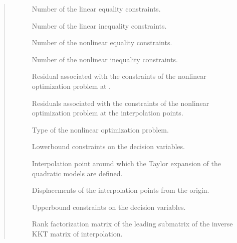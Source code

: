 \documentclass[letterpaper,10pt,english]{sphinxmanual}
\begin{document}
\begin{fulllineitems}
\begin{quote}
\begin{description}
\begin{description}
\item[{}] \leavevmode
\sphinxAtStartPar
Number of the linear equality constraints.

\item[{}] \leavevmode
\sphinxAtStartPar
Number of the linear inequality constraints.

\item[{}] \leavevmode
\sphinxAtStartPar
Number of the nonlinear equality constraints.

\item[{}] \leavevmode
\sphinxAtStartPar
Number of the nonlinear inequality constraints.

\item[{}] \leavevmode
\sphinxAtStartPar
Residual associated with the constraints of the nonlinear optimization problem at .

\item[{}] \leavevmode
\sphinxAtStartPar
Residuals associated with the constraints of the nonlinear optimization problem at the interpolation points.

\item[{}] \leavevmode
\sphinxAtStartPar
Type of the nonlinear optimization problem.

\item[{}] \leavevmode
\sphinxAtStartPar
Lower\sphinxhyphen{}bound constraints on the decision variables.

\item[{}] \leavevmode
\sphinxAtStartPar
Interpolation point around which the Taylor expansion of the quadratic models are defined.

\item[{}] \leavevmode
\sphinxAtStartPar
Displacements of the interpolation points from the origin.

\item[{}] \leavevmode
\sphinxAtStartPar
Upper\sphinxhyphen{}bound constraints on the decision variables.

\item[{}] \leavevmode
\sphinxAtStartPar
Rank factorization matrix of the leading  submatrix of the inverse KKT matrix of interpolation.


\end{description}
\end{description}
\end{quote}
\end{fulllineitems}
\end{document}
